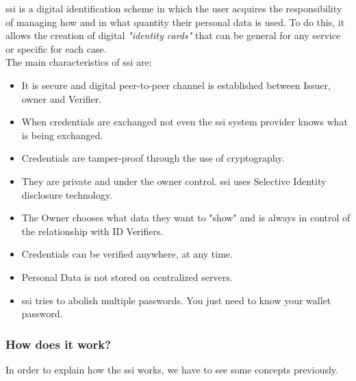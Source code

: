 \acrfull{ssi} is a digital identification scheme in which the user acquires the responsibility of managing how and in what quantity their personal data is used. To do this, it allows the creation of digital \textit{"identity cards"} that can be general for any service or specific for each case. \\
The main characteristics of \acrlong{ssi} are\cite{ssi-guide}:
\begin{itemize}
    \item It is secure and digital peer-to-peer channel is established between Issuer, owner and Verifier.
    \item When credentials are exchanged not even the \acrlong{ssi} system provider knows what is being exchanged.
    \item Credentials are tamper-proof through the use of cryptography.
    \item They are private and under the owner control. \acrshort{ssi} uses Selective Identity disclosure technology.
    \item The Owner chooses what data they want to "show" and is always in control of the relationship with ID Verifiers.
    \item Credentials can be verified anywhere, at any time.
    \item Personal Data is not stored on centralized servers.
    \item \acrshort{ssi} tries to abolish multiple passwords. You just need to know your wallet password.
\end{itemize}

\subsubsection{How does it work?}
In order to explain how the \acrshort{ssi} works, we have to see some concepts previously.
